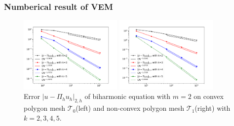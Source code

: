 \documentclass[notheorems,serif]{beamer}
\begin{document}
\begin{frame}
  \frametitle{Numberical result of VEM}
\begin{figure}[htbp]
\centering
\begin{minipage}[t]{0.49\linewidth}
\centering
\includegraphics[width=5cm]{../figures/H2_convex.pdf}
\end{minipage}%
\begin{minipage}[t]{0.49\linewidth}
\centering
\includegraphics[width=5cm]{../figures/H2_nonconvex.pdf}
\end{minipage}%
\centering
\caption{Error $|u - \Pi_h u_h|_{2, h}$ of biharmonic 
    equation with $m=2$ on convex polygon mesh $\mathcal T_0$(left) 
and non-convex polygon mesh $\mathcal T_1$(right) with $k = 2, 3, 4, 5$.}
\label{fig:H2error}
\end{figure} 
\end{frame}
\end{document}
